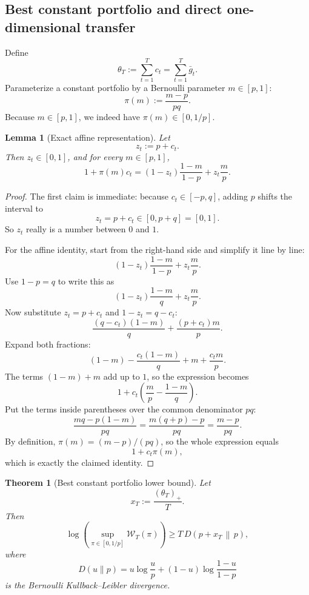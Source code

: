 \documentclass[11pt]{article}
\newtheorem{theorem}{Theorem}
\newtheorem{lemma}{Lemma}
\newcommand{\1}{\mathbf{1}}
\begin{document}
\subsection{Best constant portfolio and direct one-dimensional transfer}

Define
\[
\theta_T:=\sum_{t=1}^T c_t=\sum_{t=1}^T \bar g_t.
\]
Parameterize a constant portfolio by a Bernoulli parameter \(m\in[p,1]\):
\[
\pi(m):=\frac{m-p}{pq}.
\]
Because \(m\in[p,1]\), we indeed have \(\pi(m)\in[0,1/p]\).

\begin{lemma}[Exact affine representation]
\label{lem:app-affine}
Let
\[
z_t:=p+c_t.
\]
Then \(z_t\in[0,1]\), and for every \(m\in[p,1]\),
\[
1+\pi(m)c_t
=
(1-z_t)\frac{1-m}{1-p}
+
z_t\frac{m}{p}.
\]
\end{lemma}

\begin{proof}
The first claim is immediate: because $c_t\in[-p,q]$, adding $p$ shifts the interval to
\[
z_t=p+c_t\in[0,p+q]=[0,1].
\]
So $z_t$ really is a number between $0$ and $1$.

For the affine identity, start from the right-hand side and simplify it line by line:
\[
(1-z_t)\frac{1-m}{1-p}+z_t\frac{m}{p}.
\]
Use $1-p=q$ to write this as
\[
(1-z_t)\frac{1-m}{q}+z_t\frac{m}{p}.
\]
Now substitute $z_t=p+c_t$ and $1-z_t=q-c_t$:
\[
\frac{(q-c_t)(1-m)}{q}+\frac{(p+c_t)m}{p}.
\]
Expand both fractions:
\[
(1-m)-\frac{c_t(1-m)}{q}+m+\frac{c_t m}{p}.
\]
The terms $(1-m)+m$ add up to $1$, so the expression becomes
\[
1+c_t\left(\frac{m}{p}-\frac{1-m}{q}\right).
\]
Put the terms inside parentheses over the common denominator $pq$:
\[
\frac{mq-p(1-m)}{pq}=\frac{m(q+p)-p}{pq}=\frac{m-p}{pq}.
\]
By definition, $\pi(m)=(m-p)/(pq)$, so the whole expression equals
\[
1+c_t\pi(m),
\]
which is exactly the claimed identity.
\end{proof}

\begin{theorem}[Best constant portfolio lower bound]
\label{thm:app-best-constant}
Let
\[
x_T:=\frac{(\theta_T)_+}{T}.
\]
Then
\[
\log\!\left(\sup_{\pi\in[0,1/p]} \mathcal W_T(\pi)\right)
\ge
T\,D\!\left(p+x_T\,\middle\|\,p\right),
\]
where
\[
D(u\|p)
=
u\log\frac{u}{p}
+
(1-u)\log\frac{1-u}{1-p}
\]
is the Bernoulli Kullback--Leibler divergence.
\end{theorem}
\end{document}
